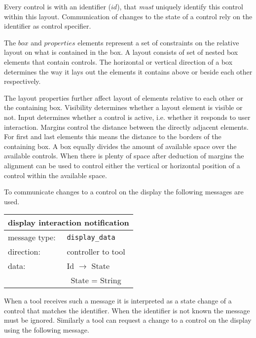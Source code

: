 \documentclass{article}
\newcommand{\msg}[1]{\texttt{#1}}
\begin{document}
   \vspace{-0.4cm}
   \noindent Every control is with an identifier ($id$), that \emph{must}
   uniquely identify this control within this layout. Communication of changes
   to the state of a control rely on the identifier as control specifier.

   \noindent The $box$ and $properties$ elements represent a set of constraints
   on the relative layout on what is contained in the box. A layout consists of
   set of nested box elements that contain controls.  The horizontal or
   vertical direction of a box determines the way it lays out the elements it
   contains above or beside each other respectively.

   The layout properties further affect layout of elements relative to each
   other or the containing box. Visibility determines whether a layout element
   is visible or not. Input determines whether a control is active, i.e.
   whether it responds to user interaction. Margins control the distance
   between the directly adjacent elements. For first and last elements this
   means the distance to the borders of the containing box. A box equally
   divides the amount of available space over the available controls. When
   there is plenty of space after deduction of margins the alignment can be
   used to control either the vertical or horizontal position of a control
   within the available space.

   To communicate changes to a control on the display the following messages
   are used.

   \begin{table}[H]
    \begin{center}
     \begin{tabular}{|ll|}
      \hline
       \multicolumn{2}{|l|}{\textbf{display interaction notification}} \\
      \hline
       message type:   & \msg{display\_data} \\
      \hline
       direction:      & controller to tool \\
       data:           & Id $\rightarrow$ State \\
                       & \ State = String \\
      \hline
     \end{tabular}
    \end{center}
   \vspace{-0.4cm}
   \end{table}

   \noindent When a tool receives such a message it is interpreted as a state
   change of a control that matches the identifier. When the identifier is not
   known the message must be ignored. Similarly a tool can request a change to
   a control on the display using the following message.
\end{document}

